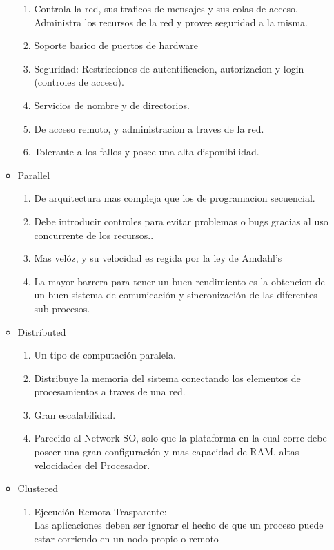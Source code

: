 \begin{itemize}
\begin{itemize}
		\begin{enumerate}
			\item Controla la red, sus traficos de mensajes y sus colas de acceso. Administra los recursos de la red y provee seguridad a la misma. 
			\item Soporte basico de puertos de hardware
			\item Seguridad: Restricciones de autentificacion, autorizacion y login (controles de acceso).
			\item Servicios de nombre y de directorios. 
			\item De acceso remoto, y administracion a traves de la red.
			\item Tolerante a los fallos y posee una alta disponibilidad. 
		\end{enumerate}
		\item Parallel
		\begin{enumerate}
			\item De arquitectura mas compleja que los de programacion secuencial.
			\item Debe introducir controles para evitar problemas o bugs gracias al uso concurrente de los recursos.. 
			\item Mas vel\'oz, y su velocidad es regida por la ley de Amdahl's 
			\item La mayor barrera para tener un buen rendimiento es la obtencion de un buen sistema de comunicaci\'on y sincronizaci\'on de las diferentes sub-procesos. 
		\end{enumerate}
		\item Distributed
		\begin{enumerate}
			\item Un tipo de computaci\'on paralela. 
			\item Distribuye la memoria del sistema conectando los elementos de procesamientos a traves de una red.
			\item Gran escalabilidad.
			\item Parecido al Network SO, solo que la plataforma en la cual corre debe poseer una gran configuraci\'on y mas capacidad de RAM, altas velocidades del Procesador.
		\end{enumerate}
		\item Clustered
		\begin{enumerate}
			\item Ejecuci\'on Remota Trasparente:\\ Las aplicaciones deben ser ignorar el hecho de que un proceso puede estar corriendo en un nodo propio o remoto 

\end{enumerate}
\end{itemize}
\end{itemize}
